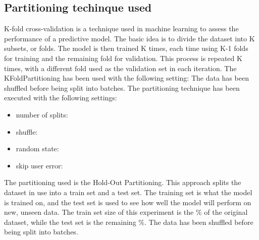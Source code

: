 \subsection{Partitioning techinque used}\label{subsec:partitioning}
K-fold cross-validation is a technique used in machine learning to assess the performance of a predictive model.
The basic idea is to divide the dataset into K subsets, or folds.
The model is then trained K times, each time using K-1 folds for training and the remaining fold for validation.
This process is repeated K times, with a different fold used as the validation set in each iteration.
\hfill\break
\hfill\break
The KFoldPartitioning has been used with the following setting:
\hfill\break
\hfill\break
{}
The data has been shuffled before being split into batches.
The partitioning technique has been executed with the following settings:
\begin{itemize}
    \item number of splits: 
    \item shuffle: 
    \item random state: 
    \item skip user error: 
\end{itemize}
\hfill\break
\hfill\break


The partitioning used is the Hold-Out Partitioning.
This approach splits the dataset in use into a train set and a test set.
The training set is what the model is trained on, and the test set is used to see how
well the model will perform on new, unseen data.
\hfill\break
\hfill\break
The train set size of this experiment is the \%
of the original dataset, while the test set is the remaining \%.
\hfill\break
\hfill\break
{}
The data has been shuffled before being split into batches.
\hfill\break
\hfill\break


